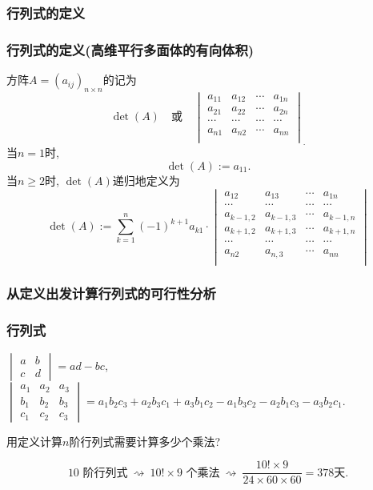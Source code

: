 




\subsubsection{行列式的定义}
\begin{frame}\frametitle{行列式的定义(高维平行多面体的有向体积)}

\begin{definition}[行列式]
方阵$A=(a_{ij})_{n\times n}$的记为
\[\det(A) \quad \text{或} \quad
\begin{vmatrix}
a_{11}&a_{12}&\cdots&a_{1n}\\
a_{21}&a_{22}&\cdots&a_{2n}\\
\cdots&\cdots&\cdots&\cdots\\
a_{n1}&a_{n2}&\cdots&a_{nn}\\
\end{vmatrix}_.\]
\pp
当$n=1$时,
\[\det(A):=a_{11}.\]
\pp
当$n\geq2$时, $\det(A)$递归地定义为
\[\det(A):=\sum_{k=1}^n(-1)^{k+1}a_{k1}\cdot
\begin{vmatrix}
a_{12}&a_{13}&\cdots&a_{1n}\\
\cdots&\cdots&\cdots&\cdots\\
a_{k-1,2}&a_{k-1,3}&\cdots&a_{k-1,n}\\
a_{k+1,2}&a_{k+1,3}&\cdots&a_{k+1,n}\\
\cdots&\cdots&\cdots&\cdots\\
a_{n2}&a_{n,3}&\cdots&a_{nn}\\
\end{vmatrix} \]
\end{definition}
\end{frame}





\subsubsection{从定义出发计算行列式的可行性分析}
\begin{frame}\frametitle{行列式}
\begin{example}
$\begin{vmatrix}a&b\\c&d\end{vmatrix}=ad-bc$,
\pp
$\begin{vmatrix}a_1&a_2&a_3\\b_1&b_2&b_3\\c_1&c_2&c_3\end{vmatrix}=a_1b_2c_3+a_2b_3c_1+a_3b_1c_2-a_1b_3c_2-a_2b_1c_3-a_3b_2c_1$.
\end{example}
\pp
\begin{question} 用定义计算$n$阶行列式需要计算多少个乘法?
\end{question}
\pp
\[10 \text{ 阶行列式} \ \rightsquigarrow \ 10!\times 9 \text{ 个乘法} \ \rightsquigarrow \ \frac{10!\times 9}{24\times60\times60}=378\text{天}.\]
\end{frame}





